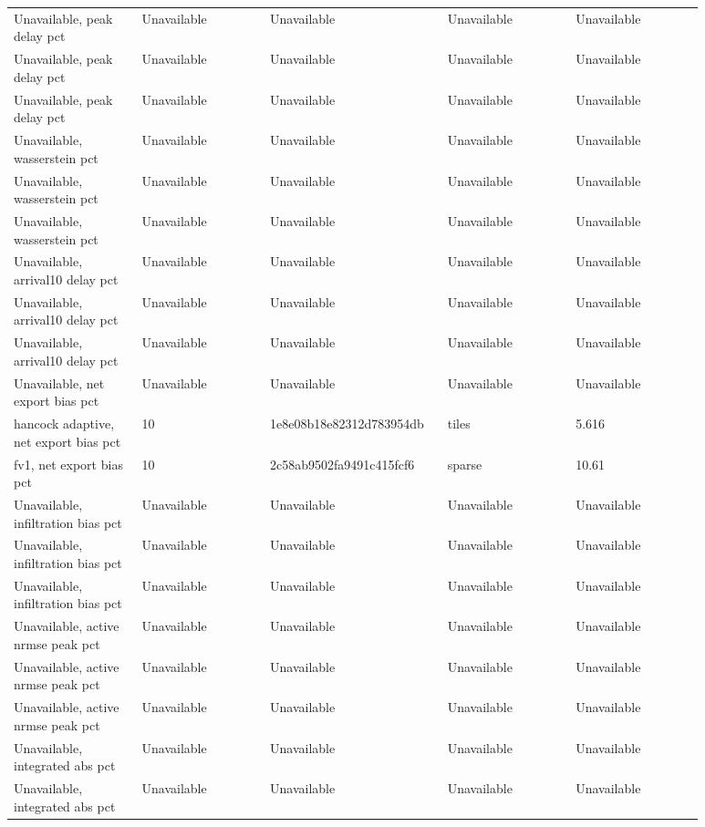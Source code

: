 \begin{longtable}{p{0.1760\linewidth}p{0.1760\linewidth}p{0.1760\linewidth}p{0.1760\linewidth}p{0.1760\linewidth}}
Unavailable, peak delay pct & Unavailable & Unavailable & Unavailable & Unavailable \\
Unavailable, peak delay pct & Unavailable & Unavailable & Unavailable & Unavailable \\
Unavailable, peak delay pct & Unavailable & Unavailable & Unavailable & Unavailable \\
Unavailable, wasserstein pct & Unavailable & Unavailable & Unavailable & Unavailable \\
Unavailable, wasserstein pct & Unavailable & Unavailable & Unavailable & Unavailable \\
Unavailable, wasserstein pct & Unavailable & Unavailable & Unavailable & Unavailable \\
Unavailable, arrival10 delay pct & Unavailable & Unavailable & Unavailable & Unavailable \\
Unavailable, arrival10 delay pct & Unavailable & Unavailable & Unavailable & Unavailable \\
Unavailable, arrival10 delay pct & Unavailable & Unavailable & Unavailable & Unavailable \\
Unavailable, net export bias pct & Unavailable & Unavailable & Unavailable & Unavailable \\
hancock adaptive, net export bias pct & 10 & 1e8e08b18e82312d783954db & tiles & 5.616 \\
fv1, net export bias pct & 10 & 2c58ab9502fa9491c415fcf6 & sparse & 10.61 \\
Unavailable, infiltration bias pct & Unavailable & Unavailable & Unavailable & Unavailable \\
Unavailable, infiltration bias pct & Unavailable & Unavailable & Unavailable & Unavailable \\
Unavailable, infiltration bias pct & Unavailable & Unavailable & Unavailable & Unavailable \\
Unavailable, active nrmse peak pct & Unavailable & Unavailable & Unavailable & Unavailable \\
Unavailable, active nrmse peak pct & Unavailable & Unavailable & Unavailable & Unavailable \\
Unavailable, active nrmse peak pct & Unavailable & Unavailable & Unavailable & Unavailable \\
Unavailable, integrated abs pct & Unavailable & Unavailable & Unavailable & Unavailable \\
Unavailable, integrated abs pct & Unavailable & Unavailable & Unavailable & Unavailable \\

\end{longtable}
